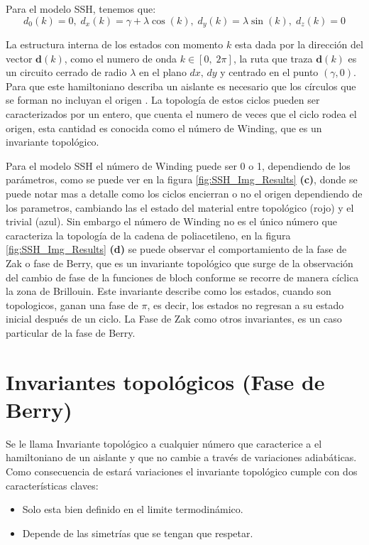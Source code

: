 Para el modelo SSH, tenemos que:
\begin{equation}
  d_0(k) = 0 ,\; d_x(k) = \gamma + \lambda \cos(k) , \; d_y(k) = \lambda \sin(k), \; d_z(k) = 0  
\end{equation}

La estructura interna de los estados con momento $k$ esta dada por la dirección del vector $\mathbf{d}(k)$, como el numero de onda $k  \in \left[ 0, \; 2\pi \right]$, la ruta que traza $\mathbf{d}(k)$ es un circuito cerrado de radio $\lambda$ en el plano $dx, \,dy$ y centrado en el punto $(\gamma, 0)$. Para que este hamiltoniano describa un aislante es necesario que los círculos que se forman no incluyan el origen \cite{Asboth2015}. La topología de estos ciclos pueden ser caracterizados por un entero, que cuenta el numero de veces que el ciclo rodea el origen, esta cantidad es conocida como el número de Winding, que es un invariante topológico.

Para el modelo SSH el número de Winding puede ser 0 o 1, dependiendo de los parámetros, como se puede ver en la figura \ref{fig:SSH_Img_Results} \textbf{(c)}, donde se puede notar mas a detalle como los ciclos encierran o no el origen dependiendo de los parametros, cambiando las el estado del material entre topológico (rojo) y el trivial (azul). Sin embargo el número de Winding no es el único número que caracteriza la topología de la cadena de poliacetileno, en la figura \ref{fig:SSH_Img_Results} \textbf{(d)} se puede observar el comportamiento de la fase de Zak o fase de Berry, que es un invariante topológico que surge de la observación del cambio de fase de la funciones de bloch conforme se recorre de manera cíclica la zona de Brillouin. Este invariante describe como los estados, cuando son topologicos, ganan una fase de $\pi$, es decir, los estados no regresan a su estado inicial después de un ciclo. La Fase de Zak como otros invariantes, es un caso particular de la fase de Berry.

\section{Invariantes topológicos (Fase de Berry)}

Se le llama Invariante topológico a cualquier número que caracterice a el hamiltoniano de un aislante y que no cambie a través de variaciones adiabáticas. Como consecuencia de estará variaciones el invariante topológico cumple con dos características claves:
\begin{itemize}
    \item Solo esta bien definido en el limite termodinámico.
    \item Depende de las simetrías que se tengan que respetar.
\end{itemize}

